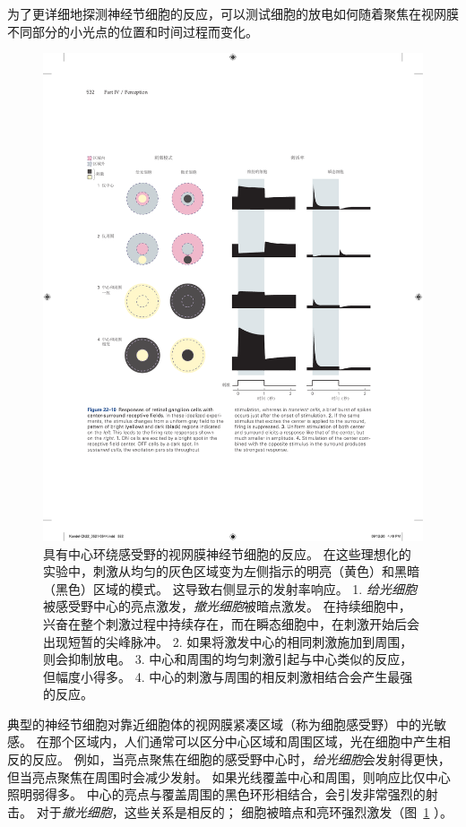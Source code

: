 为了更详细地探测神经节细胞的反应，可以测试细胞的放电如何随着聚焦在视网膜不同部分的小光点的位置和时间过程而变化。


\begin{figure}[htbp]
	\centering
	\includegraphics[width=1.0\linewidth]{chap22/fig_22_10}
	\caption{具有中心环绕感受野的视网膜神经节细胞的反应。 
		在这些理想化的实验中，刺激从均匀的灰色区域变为左侧指示的明亮（黄色）和黑暗（黑色）区域的模式。 这导致右侧显示的发射率响应。 
		1. \textit{给光细胞}被感受野中心的亮点激发，\textit{撤光细胞}被暗点激发。
		在持续细胞中，兴奋在整个刺激过程中持续存在，而在瞬态细胞中，在刺激开始后会出现短暂的尖峰脉冲。 
		2. 如果将激发中心的相同刺激施加到周围，则会抑制放电。 
		3. 中心和周围的均匀刺激引起与中心类似的反应，但幅度小得多。 
		4. 中心的刺激与周围的相反刺激相结合会产生最强的反应。}
	\label{fig:22_10}
\end{figure}


典型的神经节细胞对靠近细胞体的视网膜紧凑区域（称为细胞感受野）中的光敏感。
在那个区域内，人们通常可以区分中心区域和周围区域，光在细胞中产生相反的反应。
例如，当亮点聚焦在细胞的感受野中心时，\textit{给光细胞}会发射得更快，但当亮点聚焦在周围时会减少发射。
如果光线覆盖中心和周围，则响应比仅中心照明弱得多。 
中心的亮点与覆盖周围的黑色环形相结合，会引发非常强烈的射击。
对于\textit{撤光细胞}，这些关系是相反的； 细胞被暗点和亮环强烈激发（图~\ref{fig:22_10} ）。



